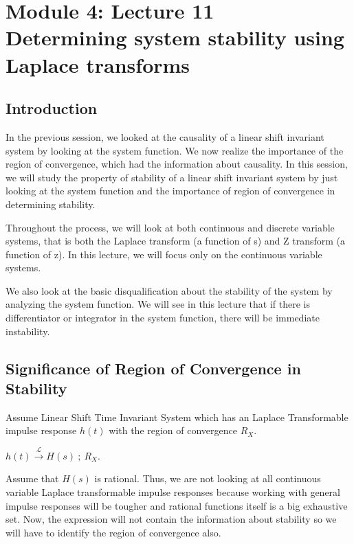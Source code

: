 \section{Module 4: Lecture 11\\Determining system stability using Laplace transforms}


\subsection{Introduction}
In the previous session, we looked at the causality of a linear shift invariant system by looking at the system function. We now realize the importance of the region of convergence, which had the information about causality. In this session, we will study the property of stability of a linear shift invariant system by just looking at the system function and the importance of region of convergence in determining stability.

Throughout the process, we will look at both continuous and discrete variable systems, that is both the Laplace transform (a function of s) and Z transform (a function of z). In this lecture, we will focus only on the continuous variable systems.

We also look at the basic disqualification about the stability of the system by analyzing the system function. We will see in this lecture that if there is differentiator or integrator in the system function, there will be immediate instability.


\subsection{Significance of Region of Convergence in Stability}
Assume Linear Shift Time Invariant System which has an Laplace Transformable impulse response $h(t)$ with the region of convergence $R_X$.
\begin{center}
$h(t) \xrightarrow{\ \mathcal{L}\ } H(s)\ ;\ R_X $.  \\
\end{center}
Assume that $H(s)$ is rational. Thus, we are not looking at all continuous variable Laplace transformable impulse responses because working with general impulse responses will be tougher and rational functions itself is a big exhaustive set.
Now, the expression will not contain the information about stability so we will have to identify the region of  convergence also. 
